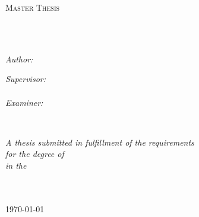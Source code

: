 \documentclass[
11pt, %
english, %
onehalfspacing, %
nolistspacing, %
parskip, %
headsepline, %
]{MastersDoctoralThesis} %
\author{Bosse \textsc{Sottmann}} %
\begin{document}
\frontmatter %

\pagestyle{plain} %


\begin{titlepage}
\begin{center}

\vspace*{.06\textheight}
{\scshape\LARGE \univname\par}\vspace{1.5cm} %
\textsc{\Large Master Thesis}\\[0.5cm] %

\HRule \\[0.4cm] %
{\huge \bfseries \ttitle\par}\vspace{0.4cm} %
\HRule \\[1.5cm] %
 
\begin{minipage}[t]{0.4\textwidth}
\begin{flushleft} \large
\emph{Author:}\\
{\authorname}
\end{flushleft}
\end{minipage}
\begin{minipage}[t]{0.4\textwidth}
\begin{flushright} \large
\emph{Supervisor:} \\
{\supname}\\
\vspace{0.5cm}
\emph{Examiner:}\\
{\examname}
\end{flushright}
\end{minipage}\\[3cm]
 
\vfill

\large \textit{A thesis submitted in fulfillment of the requirements\\ for the degree of \degreename}\\[0.3cm] %
\textit{in the}\\[0.4cm]
\groupname\\\deptname\\[2cm] %
 
\vfill

{\large \today}\\[4cm] %
 
\vfill
\end{center}
\end{titlepage}
\end{document}
